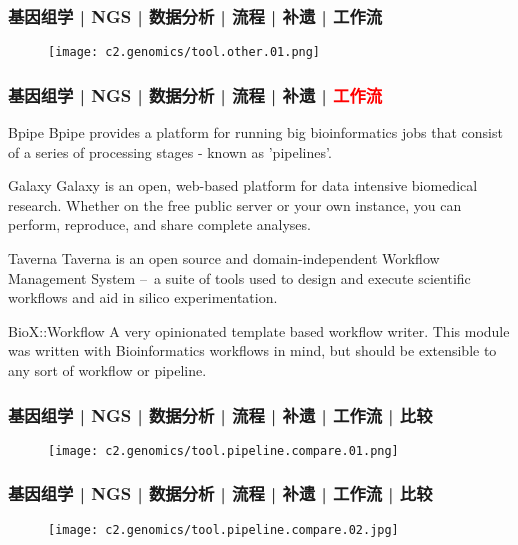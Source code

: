 \begin{frame}
  \frametitle{基因组学 | NGS | 数据分析 | 流程 | 补遗 | 工作流}
  \begin{figure}
    \centering
    \texttt{[image: c2.genomics/tool.other.01.png]}
  \end{figure}
\end{frame}

\begin{frame}
  \frametitle{基因组学 | NGS | 数据分析 | 流程 | 补遗 | \textcolor{red}{工作流}}
  {\small
  \begin{block}{Bpipe}
    Bpipe provides a platform for running big bioinformatics jobs that consist of a series of processing stages - known as 'pipelines'.
  \end{block}
  \vspace{-0.4em}
  \pause
  \begin{block}{Galaxy}
    Galaxy is an open, web-based platform for data intensive biomedical research. Whether on the free public server or your own instance, you can perform, reproduce, and share complete analyses.
  \end{block}
  \vspace{-0.4em}
  \pause
  \begin{block}{Taverna}
    Taverna is an open source and domain-independent Workflow Management System –\ a suite of tools used to design and execute scientific workflows and aid in silico experimentation.
  \end{block}
  \vspace{-0.4em}
  \pause
  \begin{block}{BioX::Workflow}
    A very opinionated template based workflow writer. This module was written with Bioinformatics workflows in mind, but should be extensible to any sort of workflow or pipeline.
  \end{block}
}
\end{frame}

\begin{frame}
  \frametitle{基因组学 | NGS | 数据分析 | 流程 | 补遗 | 工作流 | 比较}
  \begin{figure}
    \centering
    \texttt{[image: c2.genomics/tool.pipeline.compare.01.png]}
  \end{figure}
\end{frame}

\begin{frame}
  \frametitle{基因组学 | NGS | 数据分析 | 流程 | 补遗 | 工作流 | 比较}
  \begin{figure}
    \centering
    \texttt{[image: c2.genomics/tool.pipeline.compare.02.jpg]}
  \end{figure}
\end{frame}

